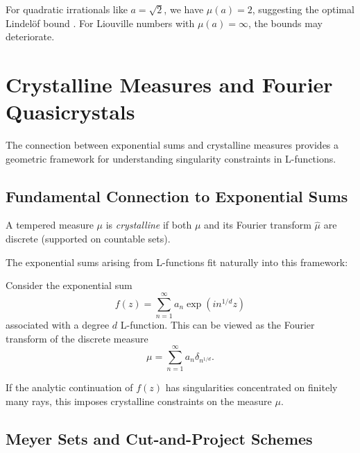 \begin{example}
For quadratic irrationals like $a = \sqrt{2}$, we have $\mu(a) = 2$, suggesting the optimal Lindelöf bound \cite{soundararajan2008}. For Liouville numbers with $\mu(a) = \infty$, the bounds may deteriorate.
\end{example}

\section{Crystalline Measures and Fourier Quasicrystals}
\label{sec:crystalline_measures}

The connection between exponential sums and crystalline measures provides a geometric framework for understanding singularity constraints in L-functions.

\subsection{Fundamental Connection to Exponential Sums}

\begin{definition}
A tempered measure $\mu$ is \emph{crystalline} if both $\mu$ and its Fourier transform $\hat{\mu}$ are discrete (supported on countable sets).
\end{definition}

The exponential sums arising from L-functions fit naturally into this framework:

\begin{proposition}
Consider the exponential sum
\begin{equation}
f(z) = \sum_{n=1}^{\infty} a_n \exp(i n^{1/d} z)
\end{equation}
associated with a degree $d$ L-function. This can be viewed as the Fourier transform of the discrete measure
\begin{equation}
\mu = \sum_{n=1}^{\infty} a_n \delta_{n^{1/d}}.
\end{equation}
\end{proposition}

If the analytic continuation of $f(z)$ has singularities concentrated on finitely many rays, this imposes crystalline constraints on the measure $\mu$.

\subsection{Meyer Sets and Cut-and-Project Schemes}

